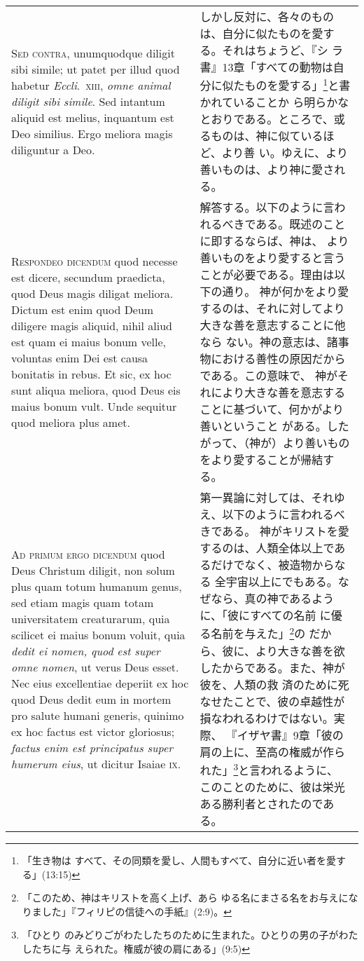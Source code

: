 \documentclass[10pt]{jsarticle} %
\begin{document}
\begin{longtable}{p{21em}p{21em}}
\\


{\scshape Sed contra}, unumquodque diligit sibi simile; ut patet per
 illud quod habetur {\itshape Eccli}.~{\scshape xiii}, {\itshape omne
 animal diligit sibi simile}. Sed intantum aliquid est melius, inquantum
 est Deo similius. Ergo meliora magis diliguntur a Deo.


&

しかし反対に、各々のものは、自分に似たものを愛する。それはちょうど、『シ
 ラ書』13章「すべての動物は自分に似たものを愛する」\footnote{「生き物は
 すべて、その同類を愛し、人間もすべて、自分に近い者を愛する」(13:15)}と書かれていることか
 ら明らかなとおりである。ところで、或るものは、神に似ているほど、より善
 い。ゆえに、より善いものは、より神に愛される。

\\


{\scshape Respondeo dicendum} quod necesse est dicere, secundum
 praedicta, quod Deus magis diligat meliora. Dictum est enim quod Deum
 diligere magis aliquid, nihil aliud est quam ei maius bonum velle,
 voluntas enim Dei est causa bonitatis in rebus. Et sic, ex hoc sunt
 aliqua meliora, quod Deus eis maius bonum vult. Unde sequitur quod
 meliora plus amet.


&

解答する。以下のように言われるべきである。既述のことに即するならば、神は、
 より善いものをより愛すると言うことが必要である。理由は以下の通り。
神が何かをより愛するのは、それに対してより大きな善を意志することに他なら
 ない。神の意志は、諸事物における善性の原因だからである。この意味で、
神がそれにより大きな善を意志することに基づいて、何かがより善いということ
 がある。したがって、（神が）より善いものをより愛することが帰結する。


\\


{\scshape Ad primum ergo dicendum} quod Deus Christum diligit, non solum
 plus quam totum humanum genus, sed etiam magis quam totam universitatem
 creaturarum, quia scilicet ei maius bonum voluit, quia {\itshape dedit ei nomen,
 quod est super omne nomen}, ut verus Deus esset. Nec eius excellentiae
 deperiit ex hoc quod Deus dedit eum in mortem pro salute humani
 generis, quinimo ex hoc factus est victor gloriosus; {\itshape factus enim est
 principatus super humerum eius}, ut dicitur Isaiae {\scshape ix}.


&

 第一異論に対しては、それゆえ、以下のように言われるべきである。
 神がキリストを愛するのは、人類全体以上であるだけでなく、被造物からなる
 全宇宙以上にでもある。なぜなら、真の神であるように、「彼にすべての名前
 に優る名前を与えた」\footnote{「このため、神はキリストを高く上げ、あら
 ゆる名にまさる名をお与えになりました」『フィリピの信徒への手紙』(2:9)。}の
 だから、彼に、より大きな善を欲したからである。また、神が彼を、人類の救
 済のために死なせたことで、彼の卓越性が損なわれるわけではない。実際、
 『イザヤ書』9章「彼の肩の上に、至高の権威が作られた」\footnote{「ひとり
 のみどりごがわたしたちのために生まれた。ひとりの男の子がわたしたちに与
 えられた。権威が彼の肩にある」(9:5)}と言われるように、
 このことのために、彼は栄光ある勝利者とされたのである。


\end{longtable}
\end{document}
